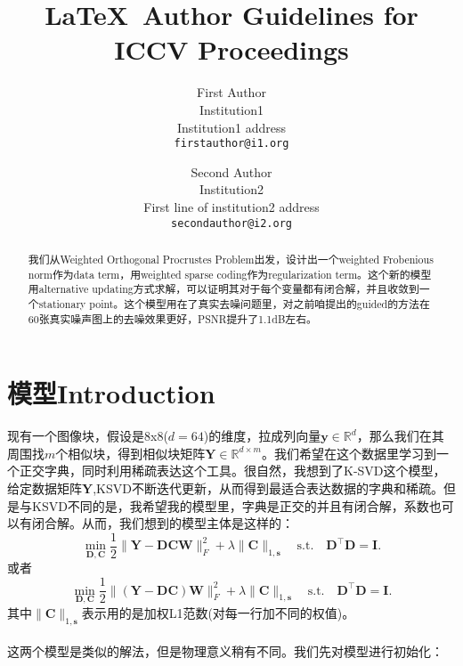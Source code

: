 \documentclass[10pt,twocolumn,letterpaper]{article}
\begin{document}
\title{\LaTeX\ Author Guidelines for ICCV Proceedings}

\author{First Author\\
Institution1\\
Institution1 address\\
{\tt\small firstauthor@i1.org}
\and
Second Author\\
Institution2\\
First line of institution2 address\\
{\tt\small secondauthor@i2.org}
}

\maketitle


\begin{abstract}
我们从Weighted Orthogonal Procrustes Problem出发，设计出一个weighted Frobenious norm作为data term，用weighted sparse coding作为regularization term。这个新的模型用alternative updating方式求解，可以证明其对于每个变量都有闭合解，并且收敛到一个stationary point。这个模型用在了真实去噪问题里，对之前咱提出的guided的方法在60张真实噪声图上的去噪效果更好，PSNR提升了1.1dB左右。
\end{abstract}

\section{模型Introduction}
现有一个图像块，假设是8x8($d=64$)的维度，拉成列向量$\mathbf{y}\in\mathbb{R}^{d}$，那么我们在其周围找$m$个相似块，得到相似块矩阵$\mathbf{Y}\in\mathbb{R}^{d\times m}$。我们希望在这个数据里学习到一个正交字典，同时利用稀疏表达这个工具。很自然，我想到了K-SVD这个模型，给定数据矩阵$\mathbf{Y}$,KSVD不断迭代更新，从而得到最适合表达数据的字典和稀疏。但是与KSVD不同的是，我希望我的模型里，字典是正交的并且有闭合解，系数也可以有闭合解。从而，我们想到的模型主体是这样的：
\begin{equation}
\min_{\mathbf{D},\mathbf{C}}\frac{1}{2}\|\mathbf{Y}-\mathbf{D}\mathbf{C}\mathbf{W}\|_{F}^{2}
+
\lambda\|\mathbf{C}\|_{1,\mathbf{s}}
\quad
\text{s.t.}
\quad
\mathbf{D}^{\top}\mathbf{D} =\mathbf{I}. 
\end{equation}
或者
\begin{equation}
\min_{\mathbf{D},\mathbf{C}}\frac{1}{2}\|(\mathbf{Y}-\mathbf{D}\mathbf{C})\mathbf{W}\|_{F}^{2}
+
\lambda\|\mathbf{C}\|_{1,\mathbf{s}}
\quad
\text{s.t.}
\quad
\mathbf{D}^{\top}\mathbf{D} =\mathbf{I}. 
\end{equation}
其中$\|\mathbf{C}\|_{1,\mathbf{s}}$表示用的是加权L1范数(对每一行加不同的权值)。
\\
\\
这两个模型是类似的解法，但是物理意义稍有不同。我们先对模型进行初始化：
\end{document}
